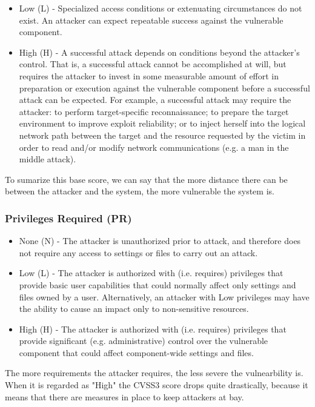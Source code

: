 \begin{itemize}
	\item Low (L) - Specialized access conditions or extenuating circumstances do not exist. An attacker can expect repeatable success against the vulnerable component.
	\item High (H) - A successful attack depends on conditions beyond the attacker's control. That is, a successful attack cannot be accomplished at will, but requires the attacker to invest in some measurable amount of effort in preparation or execution against the vulnerable component before a successful attack can be expected. For example, a successful attack may require the attacker: to perform target-specific reconnaissance; to prepare the target environment to improve exploit reliability; or to inject herself into the logical network path between the target and the resource requested by the victim in order to read and/or modify network communications (e.g. a man in the middle attack).
\end{itemize}

To sumarize this base score, we can say that the more distance there can be between the attacker and the system, the more vulnerable the system is.

\subsubsection{Privileges Required (PR)}

\begin{itemize}
	\item None (N) - The attacker is unauthorized prior to attack, and therefore does not require any access to settings or files to carry out an attack.
	\item Low (L) - The attacker is authorized with (i.e. requires) privileges that provide basic user capabilities that could normally affect only settings and files owned by a user. Alternatively, an attacker with Low privileges may have the ability to cause an impact only to non-sensitive resources.
	\item High (H) - The attacker is authorized with (i.e. requires) privileges that provide significant (e.g. administrative) control over the vulnerable component that could affect component-wide settings and files.
\end{itemize}

The more requirements the attacker requires, the less severe the vulnearbility is. When it is regarded as "High" the CVSS3 score drops quite drastically, because it means that there are measures in place to keep attackers at bay.

